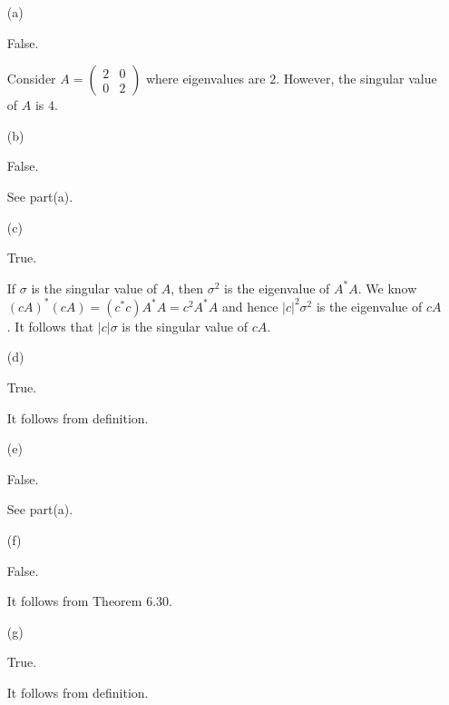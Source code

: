 \begin{Exercise}
	\begin{enumerate}[(a)]
		\item[(a)]
		\begin{answer}
			False.
		\end{answer}
		\begin{solution}
			Consider $A = \begin{pmatrix}
			2 & 0 \\
			0 & 2
			\end{pmatrix}$ where eigenvalues are $2$.
			However, the singular value of $A$ is $4$.
		\end{solution}
		
		\item[(b)]
		\begin{answer}
			False.
		\end{answer}
		\begin{solution}
			See part(a).
		\end{solution}
		
		\item[(c)]
		\begin{answer}
			True.
		\end{answer}
		\begin{solution}
			If $\sigma$ is the singular value of $A$, then $\sigma^2$ is the eigenvalue of $A^*A$.
			We know $(cA)^*(cA) = (c^*c)A^*A = c^2A^*A$ and hence $|c|^2 \sigma^2$ is the eigenvalue of $cA$.
			It follows that $|c|\sigma$ is the singular value of $cA$.
		\end{solution}
		
		\item[(d)]
		\begin{answer}
			True.
		\end{answer}
		\begin{solution}
			It follows from definition.
		\end{solution}
		
		\item[(e)]
		\begin{answer}
			False.
		\end{answer}
		\begin{solution}
			See part(a).
		\end{solution}
		
		\item[(f)]
		\begin{answer}
			False.
		\end{answer}
		\begin{solution}
			It follows from Theorem 6.30.
		\end{solution}
		
		\item[(g)]
		\begin{answer}
			True.
		\end{answer}
		\begin{solution}
			It follows from definition.		
		\end{solution}
	\end{enumerate}
\end{Exercise}